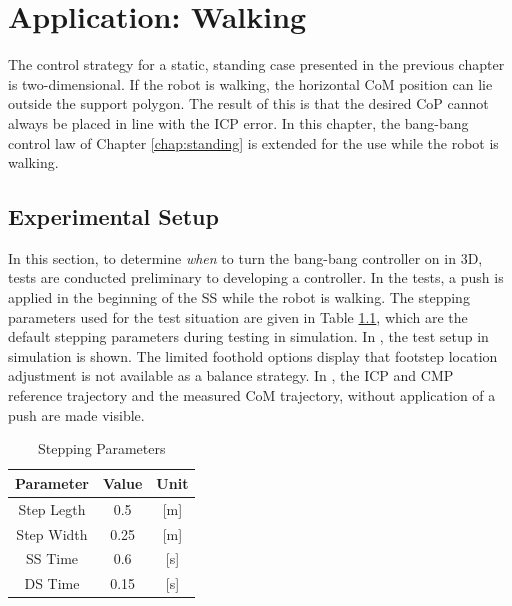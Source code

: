 %
\chapter{Application: Walking}\label{chap:walking}
The control strategy for a static, standing case presented in the previous chapter is two-dimensional. If the robot is walking, the horizontal \ac{CoM} position can lie outside the support polygon. The result of this is that the desired \ac{CoP} cannot always be placed in line with the \ac{ICP} error.  In this chapter, the bang-bang control law of Chapter \ref{chap:standing} is extended for the use while the robot is walking.
\section{Experimental Setup}
In this section, to determine \textit{when} to turn the bang-bang controller on in \ac{3D},  tests are conducted preliminary to developing a controller. In the tests, a push is applied in the beginning of the \ac{SS} while the robot is walking. The stepping parameters used for the test situation are given in Table \ref{tab:stepping}, which are the default stepping parameters during testing in simulation. In , the test setup in simulation is shown. The limited foothold options display that footstep location adjustment is not available as a balance strategy. In , the \ac{ICP} and \ac{CMP} reference trajectory and the measured \ac{CoM} trajectory, without application of a push are made visible. 
\begin{table}
\caption{Stepping Parameters} %
\centering %
\begin{tabular}{c c c } %
\hline\hline %
Parameter & Value & Unit \\
\hline %
Step Legth & 0.5 &  [m]\\
Step Width & 0.25 & [m]\\
\acs{SS} Time & 0.6 & [s]\\
\acs{DS} Time & 0.15 & [s]\\
\hline %
\end{tabular}
\label{tab:stepping} %
\end{table}
